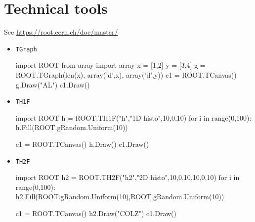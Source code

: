 \documentclass[a4paper,12pt]{article}
\begin{document}
 \section*{Technical tools}
 See \url{https://root.cern.ch/doc/master/}
 \begin{itemize}
  \item \texttt{TGraph} 
  \begin{python}
import ROOT
from array import array
x = [1,2]
y = [3,4]
g = ROOT.TGraph(len(x), array('d',x), array('d',y))
c1 = ROOT.TCanvas()
g.Draw("AL")
c1.Draw()
  \end{python}
  \item \texttt{TH1F}
  \begin{python}
import ROOT
h = ROOT.TH1F("h","1D histo",10,0,10)
for i in range(0,100):
   h.Fill(ROOT.gRandom.Uniform(10))

c1 = ROOT.TCanvas()
h.Draw()
c1.Draw()
  \end{python}
  \item \texttt{TH2F}
  \begin{python}
import ROOT
h2 = ROOT.TH2F("h2","2D histo",10,0,10,10,0,10)
for i in range(0,100):
   h2.Fill(ROOT.gRandom.Uniform(10),ROOT.gRandom.Uniform(10))

c1 = ROOT.TCanvas()
h2.Draw("COLZ")
c1.Draw()
  \end{python}
 \end{itemize}
\end{document}
